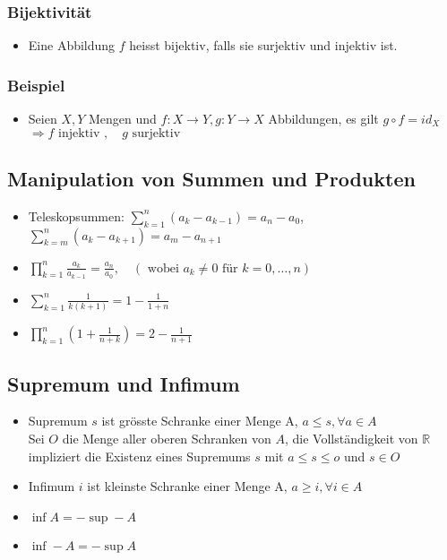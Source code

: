 \documentclass[a3paper, 11pt, landscape]{scrartcl}
\begin{document}
\begin{multicols*}{3}
	\subsubsection{Bijektivität}
	\begin{itemize}
	    \item Eine Abbildung $f$ heisst bijektiv, falls sie surjektiv und injektiv ist. 
	\end{itemize}
	\subsubsection{Beispiel}
	\begin{itemize}
	    \item Seien \(X, Y\) Mengen und \(f: X \rightarrow Y, g: Y \rightarrow X\) Abbildungen, es gilt \(g \circ f=i d_{X}\)\\
	    $\Rightarrow f \text{ injektiv },\quad g \text{ surjektiv }$
	    
	\end{itemize}
	
		\subsection{Manipulation von Summen und Produkten}
		\begin{itemize}
		    \item Teleskopsummen: $\sum_{k=1}^{n}\left(a_{k}-a_{k-1}\right)=a_{n}-a_{0}$, $\sum_{k=m}^n (a_k-a_{k+1}) = a_m - a_{n+1}$
		    \item $\prod_{k=1}^{n} \frac{a_{k}}{a_{k-1}}=\frac{a_{n}}{a_{0}}, \quad\left(\text { wobei } a_{k} \neq 0 \text { für } k=0, \ldots, n\right)$
		    \item $\sum_{k=1}^{n} \frac{1}{k(k+1)}=1-\frac{1}{1+n}$
		    \item $\prod_{k=1}^{n}\left(1+\frac{1}{n+k}\right)=2-\frac{1}{n+1}$
		\end{itemize}
		
		\subsection{Supremum und Infimum}
		\begin{itemize}
		    \item Supremum $s$ ist grösste Schranke einer Menge A, $a\leq s, \forall a \in A$\\
		    Sei $O$ die Menge aller oberen Schranken von $A$, die Vollständigkeit von $\mathbb{R}$ impliziert die Existenz eines Supremums $s$ mit $a\leq s \leq o$ und $s\in O$
		    \item Infimum $i$ ist kleinste Schranke einer Menge A, $a\geq i, \forall i \in A$
		    \item $\inf A = - \sup -A$
		    \item $\inf -A = - \sup A$
		\end{itemize}
		

\end{multicols*}
\end{document}
